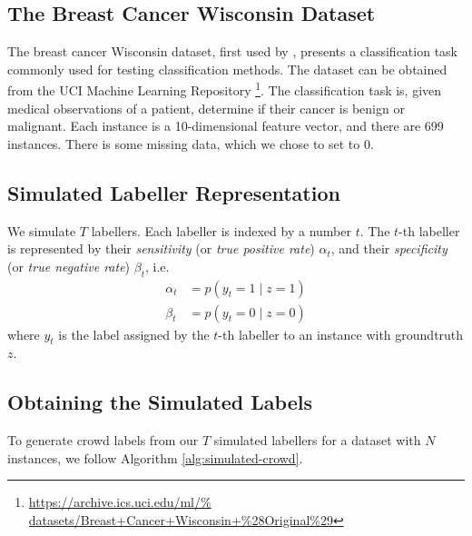     \subsection{The Breast Cancer Wisconsin Dataset}
    \label{sec:breast-dataset}

        The breast cancer Wisconsin dataset, first used by
        \citeauthor{wolberg90}, presents a classification task commonly used for
        testing classification methods. The dataset can be obtained from the UCI
        Machine Learning Repository \citep{lichman13}
        \footnote{\url{https://archive.ics.uci.edu/ml/%
                       datasets/Breast+Cancer+Wisconsin+\%28Original\%29}}.
        The classification task is, given medical observations of a patient,
        determine if their cancer is benign or malignant. Each instance is a
        10-dimensional feature vector, and there are 699 instances. There is
        some missing data, which we chose to set to 0.

    \subsection{Simulated Labeller Representation}
    \label{sec:simulated-labellers}

        We simulate $T$ labellers. Each labeller is indexed by a number $t$. The
        $t$-th labeller is represented by their \emph{sensitivity} (or \emph{true
        positive rate}) $\alpha_t$, and their \emph{specificity} (or \emph{true
        negative rate}) $\beta_t$, i.e.
        \begin{align*}
            \alpha_t &= p(y_t = 1 \mid z = 1)\\
            \beta_t &= p(y_t = 0 \mid z = 0)
        \end{align*}
        where $y_t$ is the label assigned by the $t$-th labeller to an instance
        with groundtruth $z$.

    \subsection{Obtaining the Simulated Labels}
    \label{sec:obtaining-simulated-labels}

        To generate crowd labels from our $T$ simulated labellers for a dataset
        with $N$ instances, we follow Algorithm \ref{alg:simulated-crowd}.

